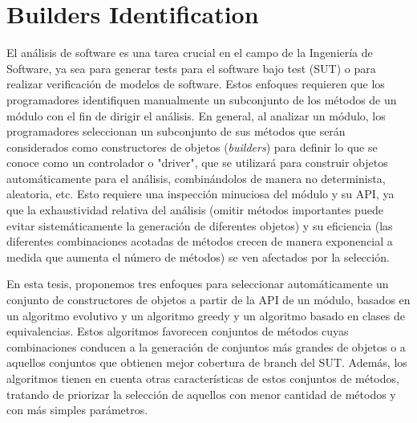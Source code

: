 \chapter[Builders Identification]{Builders Identification}
\label{cap:builders}

El análisis de software es una tarea crucial en el campo de la Ingeniería de Software, ya sea para generar tests para el software bajo test (SUT)  o para realizar verificación de modelos de software. Estos enfoques requieren que los programadores identifiquen manualmente un subconjunto de los métodos de un módulo con el fin de dirigir el análisis. En general, al analizar un módulo, los programadores seleccionan un subconjunto de sus métodos que serán considerados como constructores de objetos (\emph{builders}) para definir lo que se conoce como un controlador o "driver", que se utilizará para construir objetos automáticamente para el análisis, combinándolos de manera no determinista, aleatoria, etc. Esto requiere una inspección minuciosa del módulo y su API, ya que la exhaustividad relativa del análisis (omitir métodos importantes puede evitar sistemáticamente la generación de diferentes objetos) y su eficiencia (las diferentes combinaciones acotadas de métodos crecen de manera exponencial a medida que aumenta el número de métodos) se ven afectados por la selección.

En esta tesis, proponemos tres enfoques para seleccionar automáticamente un conjunto de constructores de objetos a partir de la API de un módulo, basados en un algoritmo evolutivo y un algoritmo greedy y un algoritmo basado en clases de equivalencias. Estos algoritmos favorecen conjuntos de métodos cuyas combinaciones conducen a la generación de conjuntos más grandes de objetos o a aquellos conjuntos que obtienen mejor cobertura de branch del SUT. Además, los algoritmos tienen en cuenta otras características de estos conjuntos de métodos, tratando de priorizar la selección de aquellos con menor cantidad de métodos y con más simples parámetros.




